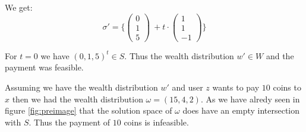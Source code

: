 \documentclass[10pt,twocolumn]{article}
\begin{document}
  We get:
\[\sigma' = \{\begin{pmatrix}0\\1\\5\end{pmatrix}\ + t\cdot \begin{pmatrix}1\\1\\-1\end{pmatrix}\}\]

  For $t=0$ we have $(0,1,5)^t\in S$.
  Thus the wealth distribution $w'\in W$ and the payment was feasible.

  Assuming we have the wealth distribution $w'$ and user $z$ wants to pay $10$ coins to $x$ then we had the wealth distribution $\omega=(15,4,2)$.
  As we have alredy seen in figure \ref{fig:preimage} that the solution space of $\omega$ does have an empty intersection with $S$.
  Thus the payment of $10$ coins is infeasible. 
\end{document}
